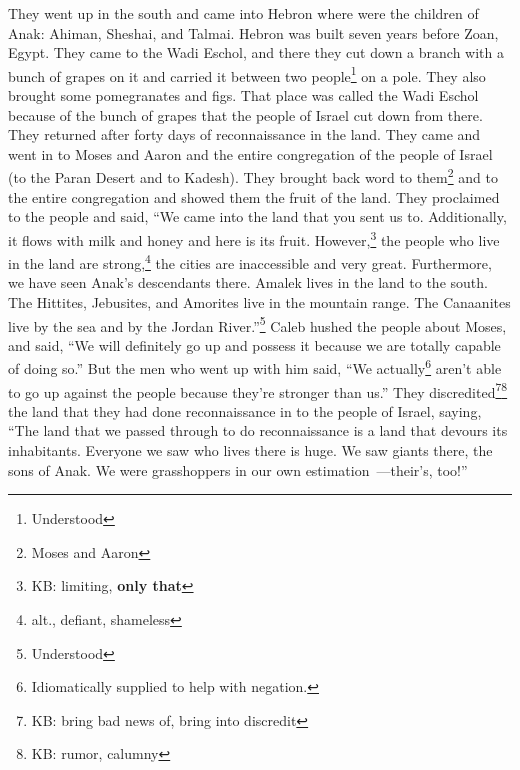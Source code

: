 \begin{inparaenum}
     They went up in the south and came into Hebron where were the children of Anak: Ahiman, Sheshai, and Talmai. Hebron was built seven years before Zoan, Egypt.%
     They came to the Wadi Eschol, and there they cut down a branch with a bunch of grapes on it and carried it between two people\footnote{Understood} on a pole. They also brought some pomegranates and figs.%
     That place was called the Wadi Eschol because of the bunch of grapes that the people of Israel cut down from there.%
     They returned after forty days of reconnaissance in the land.%
     They came and went in to Moses and Aaron and the entire congregation of the people of Israel (to the Paran Desert and to Kadesh). They brought back word to them\footnote{Moses and Aaron} and to the entire congregation and showed them the fruit of the land.%
     They proclaimed to the people and said, ``We came into the land that you sent us to. Additionally, it flows with milk and honey and here is its fruit.%
     However,\footnote{KB: limiting, \textbf{only that}} the people who live in the land are strong,\footnote{alt., defiant, shameless} the cities are inaccessible and very great. Furthermore, we have seen Anak's descendants there.%
     Amalek lives in the land to the south. The Hittites, Jebusites, and Amorites live in the mountain range. The Canaanites live by the sea and by the Jordan River.''\footnote{Understood}%
     Caleb hushed the people about Moses, and said, ``We will definitely go up and possess it because we are totally capable of doing so.''%
     But the men who went up with him said, ``We actually\footnote{Idiomatically supplied to help with negation.} aren't able to go up against the people because they're stronger than us.''%
     They discredited\footnote{KB: bring bad news of, bring into discredit}\footnote{KB: rumor, calumny} the land that they had done reconnaissance in to the people of Israel, saying, ``The land that we passed through to do reconnaissance is a land that devours its inhabitants. Everyone we saw who lives there is huge.%
     We saw giants there, the sons of Anak. We were grasshoppers in our own estimation~---their's, too!''%
\end{inparaenum}
